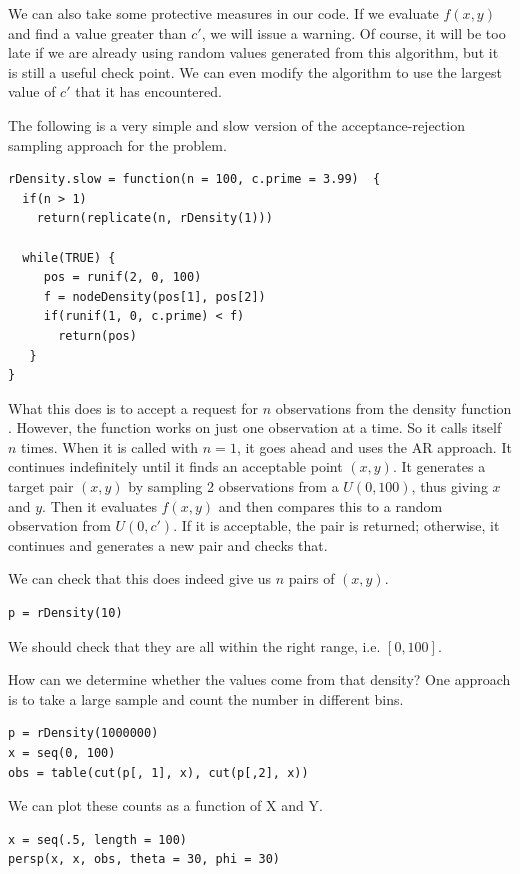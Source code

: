 \documentclass{article}
\begin{document}
\begin{description}
We can also take some protective measures in our code.  If we evaluate
$f(x, y)$ and find a value greater than $c'$, we will issue a
warning. Of course, it will be too late if we are already using random
values generated from this algorithm, but it is still a useful check
point.  We can even modify the algorithm to use the largest value of
$c'$ that it has encountered.


The following is a very simple and slow version of the
acceptance-rejection sampling approach for the problem.
\begin{verbatim}
rDensity.slow = function(n = 100, c.prime = 3.99)  {
  if(n > 1)
    return(replicate(n, rDensity(1)))

  while(TRUE) {
     pos = runif(2, 0, 100)
     f = nodeDensity(pos[1], pos[2])
     if(runif(1, 0, c.prime) < f)
       return(pos)
   }
}
\end{verbatim}
What this does is to accept a request for $n$ observations from the
density function .  However, the function works
on just one observation at a time. So it calls itself $n$ times.  When
it is called with $n = 1$, it goes ahead and uses the AR approach.  It
continues indefinitely until it finds an acceptable point $(x, y)$.
It generates a target pair $(x, y)$ by sampling 2 observations from a
$U(0, 100)$, thus giving $x$ and $y$.  Then it evaluates $f(x, y)$ and
then compares this to a random observation from $U(0, c')$.  If it is
acceptable, the pair is returned; otherwise, it continues and
generates a new pair and checks that.


We can check that this does indeed give us $n$ pairs of $(x, y)$.
\begin{verbatim}
p = rDensity(10)
\end{verbatim}
We should check that they are all within the right range, i.e. $[0,
100]$.

How can we  determine whether the values come from that
density?
One approach is to take a large sample and count the number
in different bins.
\begin{verbatim}
p = rDensity(1000000)
x = seq(0, 100)
obs = table(cut(p[, 1], x), cut(p[,2], x))
\end{verbatim}
We can plot these counts as a function of 
X and Y.
\begin{verbatim}
x = seq(.5, length = 100)
persp(x, x, obs, theta = 30, phi = 30)
\end{verbatim}


\end{description}
\end{document}

